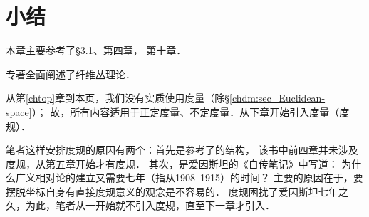 \section*{小结}
本章主要参考了\parencite{cc2001-zh}\S 3.1、第四章，%
\parencite{chen-li-2004v2}第十章．

专著\parencite{Husemoller-1994}全面阐述了纤维丛理论．



从第\ref{chtop}章到本页，我们没有实质使用度量（除\S\ref{chdm:sec_Euclidean-space}）；
故，所有内容适用于正定度量、不定度量．从下章开始引入度量（度规）．


笔者这样安排度规的原因有两个：首先是参考了\parencite{cc2001-zh}的结构，
该书中前四章并未涉及度规，从第五章开始才有度规．
其次，是爱因斯坦的《自传笔记》\parencite[p.67]{einstein-1970}中写道：
{\kaishu 为什么广义相对论的建立又需要七年（指从1908--1915）的时间？
    主要的原因在于，要摆脱坐标自身有直接度规意义的观念是不容易的．}
度规困扰了爱因斯坦七年之久，为此，笔者从一开始就不引入度规，直至下一章才引入．



\printbibliography[heading=subbibliography,title=第\ref{chfb}章参考文献]

\endinput

